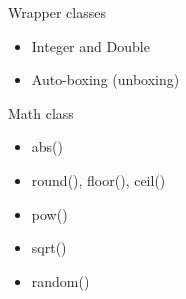 \documentclass[aspectratio=169]{beamer}
\begin{document}
\begin{frame}[fragile]{Wrapper classes}
  \begin{itemize}
    \item Integer and Double
    \item Auto-boxing (unboxing)
  \end{itemize}
\end{frame}

\begin{frame}[fragile]{Math class}
  \begin{itemize}
    \item abs()
    \item round(), floor(), ceil()
    \item pow()
    \item sqrt()
    \item random()
  \end{itemize}
\end{frame}
\end{document}

